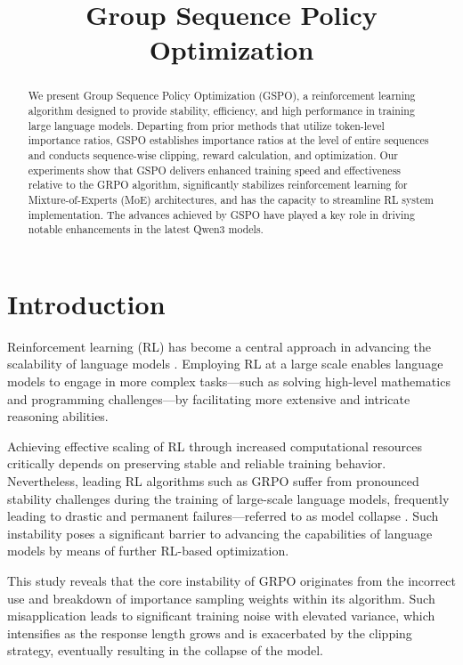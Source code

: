 \title{Group Sequence Policy Optimization}

\begin{abstract}
We present Group Sequence Policy Optimization (GSPO), a reinforcement learning algorithm designed to provide stability, efficiency, and high performance in training large language models. Departing from prior methods that utilize token-level importance ratios, GSPO establishes importance ratios at the level of entire sequences and conducts sequence-wise clipping, reward calculation, and optimization. Our experiments show that GSPO delivers enhanced training speed and effectiveness relative to the GRPO algorithm, significantly stabilizes reinforcement learning for Mixture-of-Experts (MoE) architectures, and has the capacity to streamline RL system implementation. The advances achieved by GSPO have played a key role in driving notable enhancements in the latest Qwen3 models.
\end{abstract}

\section{Introduction}
\label{sec:intro}

Reinforcement learning (RL) has become a central approach in advancing the scalability of language models \citep{o1,dpsk-r1,qwq32b,qwen3}. Employing RL at a large scale enables language models to engage in more complex tasks—such as solving high-level mathematics and programming challenges—by facilitating more extensive and intricate reasoning abilities.

Achieving effective scaling of RL through increased computational resources critically depends on preserving stable and reliable training behavior. Nevertheless, leading RL algorithms such as GRPO \citep{grpo} suffer from pronounced stability challenges during the training of large-scale language models, frequently leading to drastic and permanent failures—referred to as model collapse \citep{qwen3, minimax-m1}. Such instability poses a significant barrier to advancing the capabilities of language models by means of further RL-based optimization.

This study reveals that the core instability of GRPO originates from the incorrect use and breakdown of importance sampling weights within its algorithm. Such misapplication leads to significant training noise with elevated variance, which intensifies as the response length grows and is exacerbated by the clipping strategy, eventually resulting in the collapse of the model.

